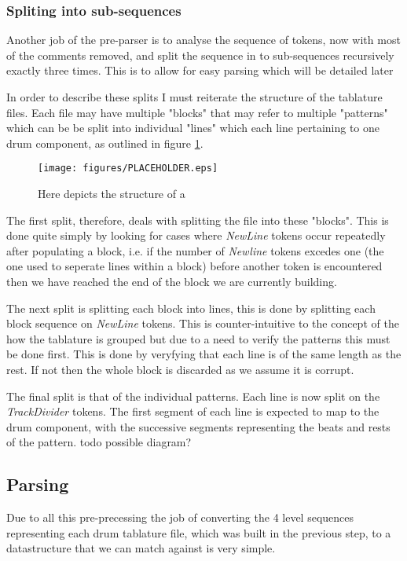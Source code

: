 \documentclass[12pt,twoside,notitlepage]{report}
\begin{document}
            \subsubsection{Spliting into sub-sequences}
            Another job of the pre-parser is to analyse the sequence of tokens, now with most of the comments removed, and split the sequence in to sub-sequences recursively exactly three times. This is to allow for easy parsing which will be detailed later
            
            In order to describe these splits I must reiterate the structure of the tablature files. Each file may have multiple "blocks" that may refer to multiple "patterns" which can be be split into individual "lines" which each line pertaining to one drum component, as outlined in figure \ref{fig:tabStruct}.
           
            
            \begin{figure}[h]
			\centerline{\texttt{[image: figures/PLACEHOLDER.eps]}}
			\caption{\label{fig:tabStruct} Here depicts the structure of a }
\end{figure}

			The first split, therefore, deals with splitting the file into these "blocks". This is done quite simply by looking for cases where \emph{NewLine} tokens occur repeatedly after populating a block, i.e. if the number of \emph{Newline} tokens excedes one (the one used to seperate lines within a block) before another token is encountered then we have reached the end of the block we are currently building.
			
			The next split is splitting each block into lines, this is done by splitting each block sequence on \emph{NewLine} tokens. This is counter-intuitive to the concept of the how the tablature is grouped but due to a need to verify the patterns this must be done first. This is done by veryfying that each line is of the same length as the rest. If not then the whole block is discarded as we assume it is corrupt.
			
			The final split is that of the individual patterns. Each line is now split on the \emph{TrackDivider} tokens. The first segment of each line is expected to map to the drum component, with the successive segments representing the beats and rests of the pattern. todo possible diagram?
			
			
		\subsection{Parsing}
			Due to all this pre-precessing the job of converting the 4 level sequences representing each drum tablature file, which was built in the previous step, to a datastructure that we can match against is very simple.
			
\end{document}
